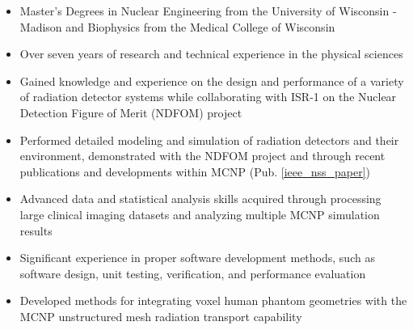 \begin{center}
\begin{minipage}{\textwidth}

  \begin{itemize}[leftmargin=.15in,rightmargin=.25in,itemsep=0.8mm]

	\item Master's Degrees in Nuclear Engineering from the University of Wisconsin - Madison and Biophysics from the Medical College of Wisconsin
	\item Over seven years of research and technical experience in the physical sciences
		
	\item Gained knowledge and experience on the design and performance of a variety of radiation detector systems while collaborating with ISR-1 on the Nuclear Detection Figure of Merit (NDFOM) project
	
	\item Performed detailed modeling and simulation of radiation detectors and their environment, demonstrated with the NDFOM project and through recent publications and developments within \textsc{MCNP} (Pub. \ref{ieee_nss_paper})
	\item Advanced data and statistical analysis skills acquired through processing large clinical imaging datasets and analyzing multiple \textsc{MCNP} simulation results 
		
	\item Significant experience in proper software development methods, such as software design, unit testing, verification, and performance evaluation
	\item Developed methods for integrating voxel human phantom geometries with the \textsc{MCNP} unstructured mesh radiation transport capability
		

\end{itemize}
\end{minipage}
\end{center}
